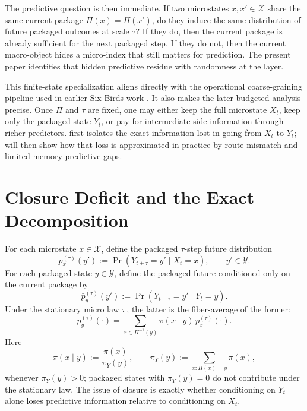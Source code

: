 \documentclass[11pt]{article}
\numberwithin{equation}{section}
\begin{document}
The predictive question is then immediate. If two microstates $x,x' \in \mathcal{X}$ share the same current package $\Pi(x)=\Pi(x')$, do they induce the same distribution of future packaged outcomes at scale $\tau$? If they do, then the current package is already sufficient for the next packaged step. If they do not, then the current macro-object hides a micro-index that still matters for prediction. The present paper identifies that hidden predictive residue with randomness at the layer.

This finite-state specialization aligns directly with the operational coarse-graining pipeline used in earlier Six Birds work \citep{tsiokos2026pica}. It also makes the later budgeted analysis precise. Once $\Pi$ and $\tau$ are fixed, one may either keep the full microstate $X_t$, keep only the packaged state $Y_t$, or pay for intermediate side information through richer predictors.  first isolates the exact information lost in going from $X_t$ to $Y_t$;  will then show how that loss is approximated in practice by route mismatch and limited-memory predictive gaps.
 \section{Closure Deficit and the Exact Decomposition}\label{sec:closure}

For each microstate $x \in \mathcal{X}$, define the packaged $\tau$-step future distribution
\begin{equation}
p_x^{(\tau)}(y') := \Pr(Y_{t+\tau}=y' \mid X_t=x),
\qquad y' \in \mathcal{Y}.
\label{eq:micro-future}
\end{equation}
For each packaged state $y \in \mathcal{Y}$, define the packaged future conditioned only on the current package by
\begin{equation}
\bar p_y^{(\tau)}(y') := \Pr(Y_{t+\tau}=y' \mid Y_t=y).
\label{eq:macro-future}
\end{equation}
Under the stationary micro law $\pi$, the latter is the fiber-average of the former:
\begin{equation}
\bar p_y^{(\tau)}(\cdot)
=
\sum_{x \in \Pi^{-1}(y)}
\pi(x \mid y)\, p_x^{(\tau)}(\cdot).
\label{eq:fiber-average}
\end{equation}
Here
\[
\pi(x \mid y) := \frac{\pi(x)}{\pi_Y(y)},
\qquad
\pi_Y(y) := \sum_{x:\Pi(x)=y}\pi(x),
\]
whenever $\pi_Y(y)>0$; packaged states with $\pi_Y(y)=0$ do not contribute under the stationary law. The issue of closure is exactly whether conditioning on $Y_t$ alone loses predictive information relative to conditioning on $X_t$.
\end{document}
